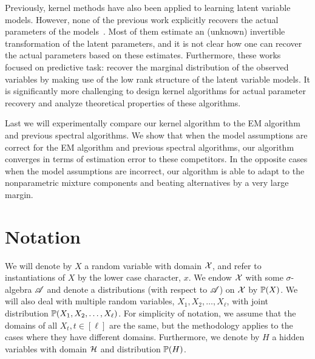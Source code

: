 \documentclass{article}
\begin{document}
Previously, kernel methods have also been applied to learning latent variable models. However, none of the previous work explicitly recovers the actual parameters of the models~\cite{xxx}. Most of them estimate an (unknown) invertible  transformation of the latent parameters, and it is not clear how one can recover the actual parameters based on these estimates. Furthermore, these works focused on predictive task: recover the marginal distribution of the observed variables by making use of the low rank structure of the latent variable models. It is significantly more challenging to design kernel algorithms for actual parameter recovery and analyze theoretical properties of these algorithms.

Last we will experimentally compare our kernel algorithm to the EM algorithm and previous spectral algorithms. We show that when the model assumptions are correct for the EM algorithm and previous spectral algorithms, our algorithm converges in terms of estimation error to these competitors. In the opposite cases when the model assumptions are incorrect, our algorithm is able to adapt to the nonparametric mixture components and beating alternatives by a very large margin.


\section{Notation}

We will denote by $X$ a random variable with domain $\mathcal{X}$,
and refer to instantiations of $X$ by the lower case character, $x$.
We endow $\mathcal{X}$ with some $\sigma$-algebra $\mathscr{A}$ and denote a distributions (with respect to $\mathscr{A}$) on $\mathcal{X}$ by $\mathbb{P}(X)$. We will also deal with multiple random variables, $X_1, X_2, \ldots, X_{\ell}$, with joint distribution $\mathbb{P}(X_1,X_2,\ldots,X_{\ell})$. For simplicity of notation, we assume that the domains of all $X_t, t \in [\ell]$ are the same, but the methodology applies to the cases where they have different domains. Furthermore, we denote by $H$ a hidden variables with domain $\mathcal{H}$ and distribution $\mathbb{P}(H)$.
\end{document}
